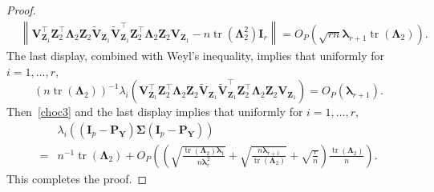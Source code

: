 \documentclass[10pt]{book}
\theoremstyle{definition}
\DeclareMathOperator{\mytr}{tr}
\newcommand{\bZ}{\mathbf{Z}}
\newcommand{\bP}{\mathbf{P}}
\newcommand{\bY}{\mathbf{Y}}
\newcommand{\bI}{\mathbf{I}}
\newcommand{\bV}{\mathbf{V}}
\newcommand{\bfsym}[1]{\ensuremath{\boldsymbol{#1}}}
\def\blambda {\bfsym {\lambda}}
\def\bLambda {\bfsym {\Lambda}}
\def\bSigma {\bfsym {\Sigma}}
\begin{document}
\begin{proof}
\begin{equation*}
        \begin{split}
            &\left\|
            \bV_{\bZ_1}^\top \bZ_2^\top \bLambda_2\bZ_{2} \tilde{\bV}_{\bZ_1}
            \tilde{\bV}_{\bZ_1}^\top \bZ_2^\top \bLambda_2 \bZ_2 \bV_{\bZ_1}
            -
            n\mytr(\bLambda_2^2)
            \bI_r
            \right\|
            =
            O_P\left(
                \sqrt{rn}\blambda_{r+1}\mytr(\bLambda_2)
        \right)
        .
        \end{split}
    \end{equation*}
    The last display, combined with Weyl's inequality, implies that uniformly for $i=1,\ldots, r$,
    \begin{equation*}
        (n\mytr(\bLambda_2))^{-1}\lambda_i\left(
            \bV_{\bZ_1}^\top \bZ_2^\top \bLambda_2\bZ_{2} \tilde{\bV}_{\bZ_1}
            \tilde{\bV}_{\bZ_1}^\top \bZ_2^\top \bLambda_2 \bZ_2 \bV_{\bZ_1}
        \right)
        =
        O_P(\blambda_{r+1})
        .
    \end{equation*}
    Then~\eqref{choc3} and the last display implies that uniformly for $i=1,\ldots,r$,
\begin{equation*}
    \begin{split}
    &\lambda_i\left(
             (\bI_p -\bP_\bY)\bSigma (\bI_p- \bP_{\bY})
         \right)
         \\
             =&
             n^{-1}\mytr(\bLambda_2)
             +O_P\left(
                 \left(
                     \sqrt{\frac{\mytr(\bLambda_2)\blambda_1}{n\blambda_r^2}}  
                     +\sqrt{\frac{n\blambda_{r+1}}{\mytr(\bLambda_2)}}
                     +\sqrt{\frac{r}{n}}
                 \right)
             \frac{\mytr(\bLambda_2)}{n}\right).
    \end{split}
\end{equation*}
This completes the proof.

\end{proof}
\end{document}

